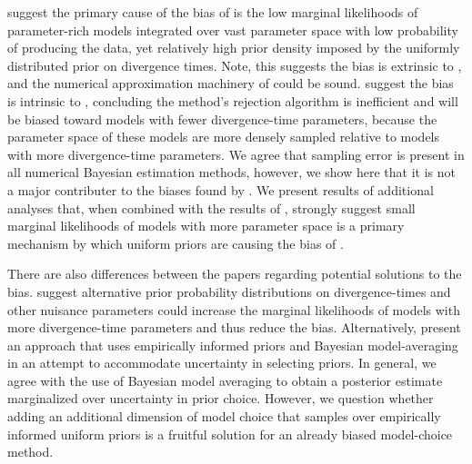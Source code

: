 \citet{Oaks2012} suggest the primary cause of the bias of \msb is the low
marginal likelihoods of parameter-rich models integrated over vast parameter
space with low probability of producing the data, yet relatively high prior
density \citep{Lindley1957} imposed by the uniformly distributed prior on
divergence times.
Note, this suggests the bias is extrinsic to \msb, and the numerical
approximation machinery of \msb could be sound.
\citet{Hickerson2013} suggest the bias is intrinsic to \msb, concluding the
method's rejection algorithm is inefficient and will be biased
toward models with fewer divergence-time parameters, because the parameter
space of these models are more densely sampled relative to models with more
divergence-time parameters.
We agree that sampling error is present in all numerical Bayesian estimation
methods, however, we show here that it is not a major contributer to the
biases found by \citet{Oaks2012}.
We present results of additional analyses that, when combined with
the results of \citet{Oaks2012}, strongly suggest small marginal likelihoods of
models with more parameter space is a primary mechanism by which uniform priors
are causing the bias of \msb.


There are also differences between the papers regarding potential solutions to
the bias.
\citet{Oaks2012} suggest alternative prior probability distributions on
divergence-times and other nuisance parameters could increase the marginal
likelihoods of models with more divergence-time parameters and thus reduce the
bias.
Alternatively, \citet{Hickerson2013} present an approach that uses empirically
informed priors and Bayesian model-averaging in an attempt to accommodate
uncertainty in selecting priors.
In general, we agree with the use of Bayesian model averaging to obtain a
posterior estimate marginalized over uncertainty in prior choice.
However, we question whether adding an additional dimension of model choice
that samples over empirically informed uniform priors is a fruitful solution
for an already biased model-choice method.

